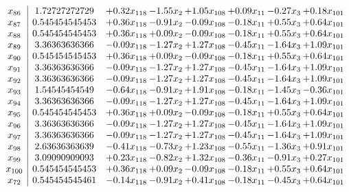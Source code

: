 \documentclass[8pt]{article}
\begin{document}
\[\begin{array}{c| c c@{\hskip 2pt} c@{\hskip 2pt} c@{\hskip 2pt} c@{\hskip 2pt} c@{\hskip 2pt} c@{\hskip 2pt} }
 x_{86}   &  1.72727272729 & +  0.32 x_{118} & -1.55 x_{2} & +  1.05 x_{108} & +  0.09 x_{11} & -0.27 x_{3} & +  0.18 x_{101}\\
 x_{87}   &  0.545454545453 & +  0.36 x_{118} & -0.91 x_{2} & -0.09 x_{108} & -0.18 x_{11} & +  0.55 x_{3} & +  0.64 x_{101}\\
 x_{88}   &  0.545454545453 & +  0.36 x_{118} & +  0.09 x_{2} & -0.09 x_{108} & -0.18 x_{11} & +  0.55 x_{3} & +  0.64 x_{101}\\
 x_{89}   &  3.36363636366 & -0.09 x_{118} & -1.27 x_{2} & +  1.27 x_{108} & -0.45 x_{11} & -1.64 x_{3} & +  1.09 x_{101}\\
 x_{90}   &  0.545454545453 & +  0.36 x_{118} & +  0.09 x_{2} & -0.09 x_{108} & -0.18 x_{11} & +  0.55 x_{3} & +  0.64 x_{101}\\
 x_{91}   &  3.36363636366 & -0.09 x_{118} & -1.27 x_{2} & +  1.27 x_{108} & -0.45 x_{11} & -1.64 x_{3} & +  1.09 x_{101}\\
 x_{92}   &  3.36363636366 & -0.09 x_{118} & -1.27 x_{2} & +  1.27 x_{108} & -0.45 x_{11} & -1.64 x_{3} & +  1.09 x_{101}\\
 x_{93}   &  1.54545454549 & -0.64 x_{118} & -0.91 x_{2} & +  1.91 x_{108} & -0.18 x_{11} & -1.45 x_{3} & -0.36 x_{101}\\
 x_{94}   &  3.36363636366 & -0.09 x_{118} & -1.27 x_{2} & +  1.27 x_{108} & -0.45 x_{11} & -1.64 x_{3} & +  1.09 x_{101}\\
 x_{95}   &  0.545454545453 & +  0.36 x_{118} & +  0.09 x_{2} & -0.09 x_{108} & -0.18 x_{11} & +  0.55 x_{3} & +  0.64 x_{101}\\
 x_{96}   &  3.36363636366 & -0.09 x_{118} & -1.27 x_{2} & +  1.27 x_{108} & -0.45 x_{11} & -1.64 x_{3} & +  1.09 x_{101}\\
 x_{97}   &  3.36363636366 & -0.09 x_{118} & -1.27 x_{2} & +  1.27 x_{108} & -0.45 x_{11} & -1.64 x_{3} & +  1.09 x_{101}\\
 x_{98}   &  2.63636363639 & -0.41 x_{118} & -0.73 x_{2} & +  1.23 x_{108} & -0.55 x_{11} & -1.36 x_{3} & +  0.91 x_{101}\\
 x_{99}   &  3.09090909093 & +  0.23 x_{118} & -0.82 x_{2} & +  1.32 x_{108} & -0.36 x_{11} & -0.91 x_{3} & +  0.27 x_{101}\\
 x_{100}   &  0.545454545453 & +  0.36 x_{118} & +  0.09 x_{2} & -0.09 x_{108} & -0.18 x_{11} & +  0.55 x_{3} & +  0.64 x_{101}\\
 x_{72}   &  0.545454545461 & -0.14 x_{118} & -0.91 x_{2} & +  0.41 x_{108} & -0.18 x_{11} & -0.45 x_{3} & +  0.64 x_{101}\\

\end{array}\]
\end{document}
